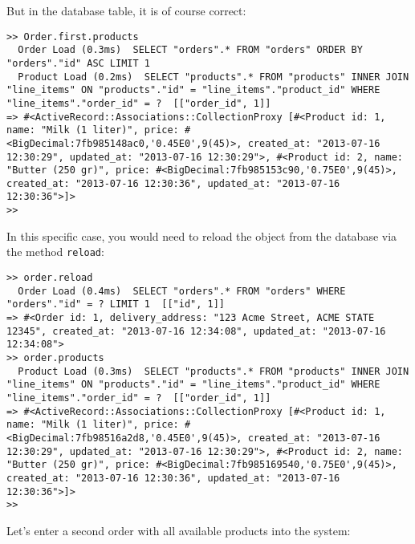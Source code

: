 \documentclass[a4paper]{book}
\newcounter{tab}[chapter]
\begin{document}
But in the database table, it is of course correct:

\begin{shaded}\begin{verbatim}
>> Order.first.products
  Order Load (0.3ms)  SELECT "orders".* FROM "orders" ORDER BY "orders"."id" ASC LIMIT 1
  Product Load (0.2ms)  SELECT "products".* FROM "products" INNER JOIN "line_items" ON "products"."id" = "line_items"."product_id" WHERE "line_items"."order_id" = ?  [["order_id", 1]]
=> #<ActiveRecord::Associations::CollectionProxy [#<Product id: 1, name: "Milk (1 liter)", price: #<BigDecimal:7fb985148ac0,'0.45E0',9(45)>, created_at: "2013-07-16 12:30:29", updated_at: "2013-07-16 12:30:29">, #<Product id: 2, name: "Butter (250 gr)", price: #<BigDecimal:7fb985153c90,'0.75E0',9(45)>, created_at: "2013-07-16 12:30:36", updated_at: "2013-07-16 12:30:36">]>
>>
\end{verbatim}\end{shaded}

In this specific case, you would need to reload the object from the database via the method \texttt{reload}:

\begin{shaded}\begin{verbatim}
>> order.reload
  Order Load (0.4ms)  SELECT "orders".* FROM "orders" WHERE "orders"."id" = ? LIMIT 1  [["id", 1]]
=> #<Order id: 1, delivery_address: "123 Acme Street, ACME STATE 12345", created_at: "2013-07-16 12:34:08", updated_at: "2013-07-16 12:34:08">
>> order.products
  Product Load (0.3ms)  SELECT "products".* FROM "products" INNER JOIN "line_items" ON "products"."id" = "line_items"."product_id" WHERE "line_items"."order_id" = ?  [["order_id", 1]]
=> #<ActiveRecord::Associations::CollectionProxy [#<Product id: 1, name: "Milk (1 liter)", price: #<BigDecimal:7fb98516a2d8,'0.45E0',9(45)>, created_at: "2013-07-16 12:30:29", updated_at: "2013-07-16 12:30:29">, #<Product id: 2, name: "Butter (250 gr)", price: #<BigDecimal:7fb985169540,'0.75E0',9(45)>, created_at: "2013-07-16 12:30:36", updated_at: "2013-07-16 12:30:36">]>
>>
\end{verbatim}\end{shaded}

Let's enter a second order with all available products into the system:
\end{document}
